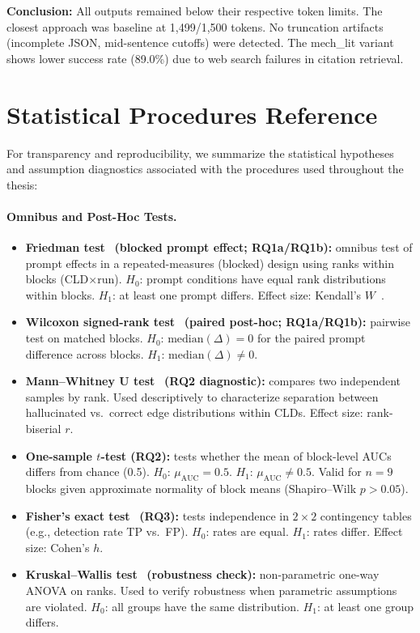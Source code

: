 \textbf{Conclusion:} All outputs remained below their respective token limits. The closest approach was baseline at 1,499/1,500 tokens. No truncation artifacts (incomplete JSON, mid-sentence cutoffs) were detected. The mech\_lit variant shows lower success rate (89.0\%) due to web search failures in citation retrieval.

\section{Statistical Procedures Reference}
\label{app:statistical_procedures_reference}

For transparency and reproducibility, we summarize the statistical hypotheses and assumption diagnostics associated with the procedures used throughout the thesis:

\paragraph{Omnibus and Post-Hoc Tests.}
\begin{itemize}[noitemsep]
    \item \textbf{Friedman test}~\cite{friedman1937use} \textbf{(blocked prompt effect; RQ1a/RQ1b):} omnibus test of prompt effects in a repeated-measures (blocked) design using ranks within blocks (CLD$\times$run). $H_0$: prompt conditions have equal rank distributions within blocks. $H_1$: at least one prompt differs. Effect size: Kendall's $W$~\cite{kendall1939problem}.
    \item \textbf{Wilcoxon signed-rank test}~\cite{wilcoxon1945individual} \textbf{(paired post-hoc; RQ1a/RQ1b):} pairwise test on matched blocks. $H_0$: $\mathrm{median}(\Delta)=0$ for the paired prompt difference across blocks. $H_1$: $\mathrm{median}(\Delta)\neq 0$.
    \item \textbf{Mann--Whitney U test}~\cite{mann1947test} \textbf{(RQ2 diagnostic):} compares two independent samples by rank. Used descriptively to characterize separation between hallucinated vs.\ correct edge distributions within CLDs. Effect size: rank-biserial $r$.
    \item \textbf{One-sample $t$-test (RQ2):} tests whether the mean of block-level AUCs differs from chance (0.5). $H_0$: $\mu_{\text{AUC}}=0.5$. $H_1$: $\mu_{\text{AUC}}\neq 0.5$. Valid for $n=9$ blocks given approximate normality of block means (Shapiro--Wilk $p>0.05$).
    \item \textbf{Fisher's exact test}~\cite{fisher1922interpretation} \textbf{(RQ3):} tests independence in $2\times2$ contingency tables (e.g., detection rate TP vs.\ FP). $H_0$: rates are equal. $H_1$: rates differ. Effect size: Cohen's $h$.
    \item \textbf{Kruskal--Wallis test}~\cite{kruskal1952use} \textbf{(robustness check):} non-parametric one-way ANOVA on ranks. Used to verify robustness when parametric assumptions are violated. $H_0$: all groups have the same distribution. $H_1$: at least one group differs.
\end{itemize}

